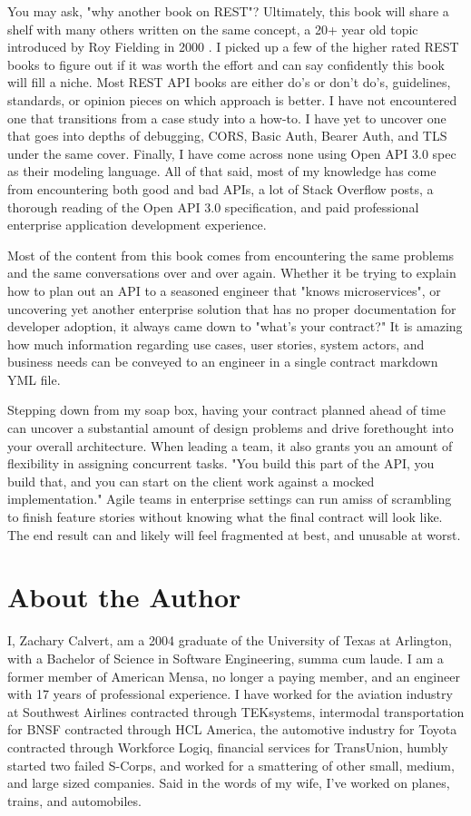 You may ask, "why another book on REST"?  Ultimately, this book will share a shelf with many others written on the same concept, a 20+ year old topic introduced by Roy Fielding in 2000 \cite{fielding}.  I picked up a few of the higher rated REST books to figure out if it was worth the effort and can say confidently this book will fill a niche. Most REST API books are either do's or don't do's, guidelines, standards, or opinion pieces on which approach is better.  I have not encountered one that transitions from a case study into a how-to.  I have yet to uncover one that goes into depths of debugging, CORS, Basic Auth, Bearer Auth, and TLS under the same cover.  Finally, I have come across none using Open API 3.0 spec as their modeling language.  All of that said, most of my knowledge has come from encountering both good and bad APIs, a lot of Stack Overflow posts, a thorough reading of the Open API 3.0 specification, and paid professional enterprise application development experience.

Most of the content from this book comes from encountering the same problems and the same conversations over and over again.  Whether it be trying to explain how to plan out an API to a seasoned engineer that "knows microservices", or uncovering yet another enterprise solution that has no proper documentation for developer adoption, it always came down to "what's your contract?"  It is amazing how much information regarding use cases, user stories, system actors, and business needs can be conveyed to an engineer in a single contract markdown YML file.

Stepping down from my soap box, having your contract planned ahead of time can uncover a substantial amount of design problems and drive forethought into your overall architecture.  When leading a team, it also grants you an amount of flexibility in assigning concurrent tasks.  "You build this part of the API, you build that, and you can start on the client work against a mocked implementation."  Agile teams in enterprise settings can run amiss of scrambling to finish feature stories without knowing what the final contract will look like.  The end result can and likely will feel fragmented at best, and unusable at worst.

\section*{About the Author}

I, Zachary Calvert, am a 2004 graduate of the University of Texas at Arlington, with a Bachelor of Science in Software Engineering, summa cum laude.  I am a former member of American Mensa, no longer a paying member, and an engineer with 17 years of professional experience.  I have worked for the aviation industry at Southwest Airlines contracted through TEKsystems, intermodal transportation for BNSF contracted through HCL America, the automotive industry for Toyota contracted through Workforce Logiq, financial services for TransUnion, humbly started two failed S-Corps, and worked for a smattering of other small, medium, and large sized companies.  Said in the words of my wife, I've worked on planes, trains, and automobiles.

